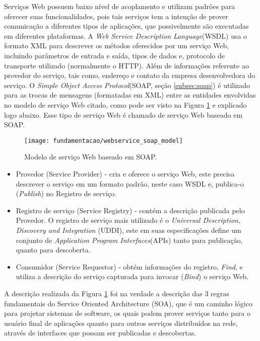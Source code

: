 Serviços Web possuem baixo nível de acoplamento e utilizam padrões para oferecer suas funcionalidades, pois tais serviços tem a intenção de prover comunicação a diferentes tipos de aplicações, que possivelmente são executadas em diferentes plataformas. A \textit{Web Service Description Language}(WSDL) usa o formato XML para descrever os métodos oferecidos por um serviço Web, incluindo parâmetros de entrada e saída, tipos de dados e, protocolo de transporte utilizado (normalmente o HTTP). Além de informações referente ao provedor do serviço, tais como, endereço e contato da empresa desenvolvedora do serviço. O \textit{Simple Object Access Protocol}(SOAP, seção \ref{subsec:soap}) é utilizado para as trocas de mensagens (formatadas em XML) entre as entidades envolvidas no modelo de serviço Web citado\cite{Dustdar:2005}, como pode ser visto na Figura \ref{fig:wsmodelsoap} e explicado logo abaixo. Esse tipo de serviço Web é chamado de serviço Web baseado em SOAP\cite{Belqasmi:2011}.

\begin{figure}[!htb] \centering 
  \centering
  \texttt{[image: fundamentacao/webservice\_soap\_model]} 
  \caption{Modelo de serviço Web baseado em SOAP.\cite{Belqasmi:2011}} 
  \label{fig:wsmodelsoap}
\end{figure}

\begin{itemize}
\item Provedor (Service Provider) - cria e oferece o serviço Web, este precisa descrever o serviço em um formato padrão, neste caso WSDL e, publica-o (\textit{Publish}) no Registro de serviço.
\item Registro de serviço (Service Registry) - contém a descrição publicada pelo Provedor. O registro de serviço mais utilizado é o \textit{Universal Description, Discovery and Integration} (UDDI), este em suas especificações define um conjunto de \textit{Application Program Interfaces}(APIs) tanto para publicação, quanto para descoberta\cite{Belqasmi:2011}.
\item Consumidor (Service Requestor) - obtém informações do registro, \textit{Find}, e utiliza a descrição do serviço capturada para invocar (\textit{Bind}) o serviço Web.
\end{itemize}

A descrição realizada da Figura \ref{fig:wsmodelsoap} foi na verdade a descrição das 3 regras fundamentais do Service Oriented Architecture (SOA), que é um caminho lógico para projetar sistemas de software, os quais podem prover serviços tanto para o usuário final de aplicações quanto para outros serviços distribuídos na rede, através de interfaces que possam ser publicadas e descobertas.\cite{Papazoglou:2008}

